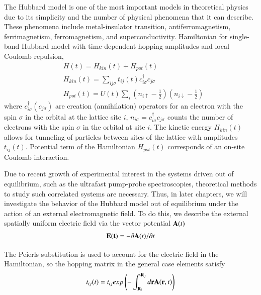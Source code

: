 The Hubbard model is one of the most important models in theoretical physics due to its simplicity and the number of physical phenomena that it can describe. These phenomena include metal-insulator transition, antiferromagnetism, ferrimagnetism, ferromagnetism, and superconductivity. 
Hamiltonian for single-band Hubbard model with time-dependent hopping amplitudes and local Coulomb repulsion,
\begin{subequations}
\begin{align}
\label{Habbard_Hamiltonian}
&
H(t)=H_{kin}(t)+H_{pot}(t)
\\
\label{Habbard_Hamiltonian_kin}
&
H_{kin}(t)=\sum_{ij\sigma} {t_{ij}(t)c^{\dagger}_{i \sigma} c_{j \sigma}}
\\
\label{Habbard_Hamiltonian_pot}
&
H_{pot}(t)=U(t) \sum_i{(n_{i\uparrow}-\frac{1}{2})(n_{i\downarrow}-\frac{1}{2})}
\end{align}
\end{subequations}
where $c^{\dagger}_{i \sigma}(c_{j \sigma})$ are creation (annihilation) operators for an electron with the spin $\sigma$ in the orbital at the lattice site $i$, $n_{i\sigma}=c^{\dagger}_{i \sigma} c_{j \sigma}$ counts the number of electrons with the spin $\sigma$ in the orbital at site $i$. The kinetic energy $H_{kin}(t)$ allows for tunneling of particles between sites of the lattice with amplitudes $t_{ij}(t)$. Potential term of the Hamiltonian $H_{pot}(t)$ corresponds of an on-site Coulomb interaction.

Due to recent growth of experimental interest in the systems driven out of equilibrium, such as the ultrafast pump-probe spectroscopies, theoretical methods to study such correlated systems are necessary. Thus, in later chapters, we will investigate the behavior of the Hubbard model out of equilibrium under the action of an external electromagnetic field. To do this, we describe the external spatially uniform electric field via the vector potential ${\bf A}(t)$
\begin{align}
\label{Vector_potential}
{\bf E(t)} = -\partial{\bf A}(t)/\partial t
\end{align}

The Peierls substitution \citep{Peierls1933} is used to account for the electric field in the Hamiltonian, so the hopping matrix in the general case elements satisfy
\begin{align}
\label{hoppings_1}
t_{ij}(t)=t_{ij}exp \left(-\int_{{\bf R}_i}^{{\bf R}_j} d{\bf r} {\bf A}({\bf{r}},t)\right)  
\end{align}

